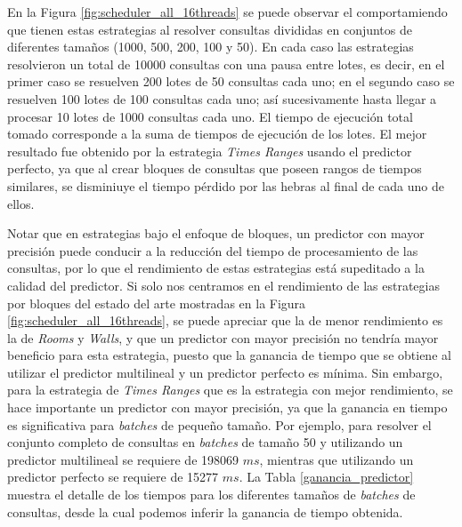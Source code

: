 En la Figura \ref{fig:scheduler_all_16threads} se puede observar el comportamiendo que tienen estas estrategias al resolver consultas divididas en conjuntos de diferentes tamaños (1000, 500, 200, 100 y 50). En cada caso las estrategias resolvieron un total de 10000 consultas con una pausa entre lotes, es decir, en el primer caso se resuelven 200 lotes de 50 consultas cada uno; en el segundo caso se resuelven 100 lotes de 100 consultas cada uno; así sucesivamente hasta llegar a procesar 10 lotes de 1000 consultas cada uno. El tiempo de ejecución total tomado corresponde a la suma de tiempos de ejecución de los lotes. El mejor resultado fue obtenido por la estrategia \textit{Times Ranges} usando el predictor perfecto, ya que al crear bloques de consultas que poseen rangos de tiempos similares, se disminiuye el tiempo pérdido por las hebras al final de cada uno de ellos.

Notar que en estrategias bajo el enfoque de bloques, un predictor con mayor precisión puede conducir a la reducción del tiempo de procesamiento de las consultas, por lo que el rendimiento de estas estrategias está supeditado a la calidad del predictor. Si solo nos centramos en el rendimiento de las estrategias por bloques del estado del arte mostradas en la Figura \ref{fig:scheduler_all_16threads}, se puede apreciar que la de menor rendimiento es la de \textit{Rooms} y \textit{Walls}, y que un predictor con mayor precisión no tendría mayor beneficio para esta estrategia, puesto que la ganancia de tiempo que se obtiene al utilizar el predictor multilineal y un predictor perfecto es mínima. Sin embargo, para la estrategia de \textit{Times Ranges} que es la estrategia con mejor rendimiento, se hace importante un predictor con mayor precisión, ya que la ganancia en tiempo es significativa para \textit{batches} de pequeño tamaño. Por ejemplo, para resolver el conjunto completo de consultas en \textit{batches} de tamaño 50 y utilizando un predictor multilineal se requiere de 198069 $ms$, mientras que utilizando un predictor perfecto se requiere de 15277 $ms$. La Tabla \ref{ganancia_predictor} muestra el detalle de los tiempos para los diferentes tamaños de \textit{batches} de consultas, desde la cual podemos inferir la ganancia de tiempo obtenida.

